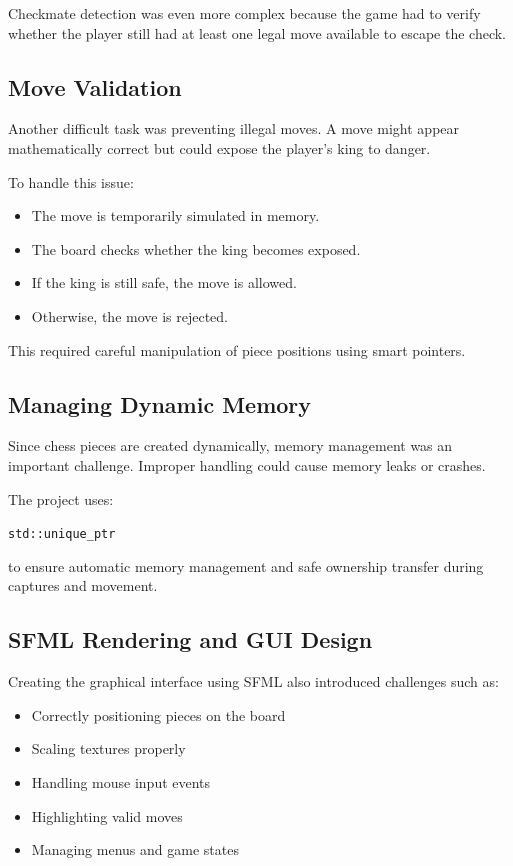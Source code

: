 \documentclass[11pt]{article}
\begin{document}
Checkmate detection was even more complex because the game had to verify whether the player still had at least one legal move available to escape the check.

\subsection{Move Validation}

Another difficult task was preventing illegal moves. A move might appear mathematically correct but could expose the player's king to danger.

To handle this issue:

\begin{itemize}
    \item The move is temporarily simulated in memory.
    \item The board checks whether the king becomes exposed.
    \item If the king is still safe, the move is allowed.
    \item Otherwise, the move is rejected.
\end{itemize}

This required careful manipulation of piece positions using smart pointers.

\subsection{Managing Dynamic Memory}

Since chess pieces are created dynamically, memory management was an important challenge. Improper handling could cause memory leaks or crashes.

The project uses:

\begin{center}
\texttt{std::unique\_ptr}
\end{center}

to ensure automatic memory management and safe ownership transfer during captures and movement.

\subsection{SFML Rendering and GUI Design}

Creating the graphical interface using SFML also introduced challenges such as:

\begin{itemize}
    \item Correctly positioning pieces on the board
    \item Scaling textures properly
    \item Handling mouse input events
    \item Highlighting valid moves
    \item Managing menus and game states
\end{itemize}
\end{document}
